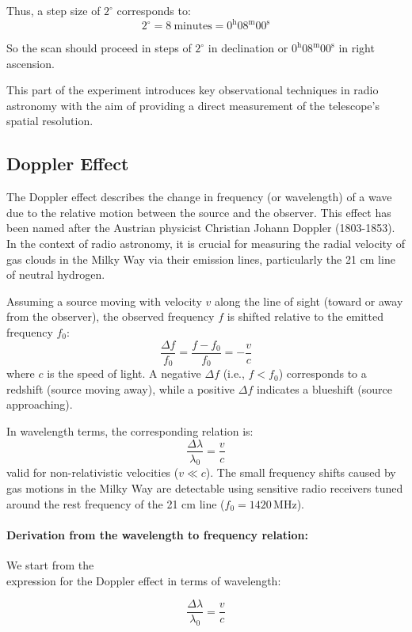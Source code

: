 \documentclass[12pt,a4paper]{article}
\begin{document}
Thus, a step size of \( 2^\circ \) corresponds to: 
\[
\boxed{
2^\circ = 8\ \text{minutes} = 0^\text{h}08^\text{m}00^\text{s}
}
\]

\noindent So the scan should proceed in steps of \( 2^\circ \) in declination or \( 0^\text{h}08^\text{m}00^\text{s} \) in right ascension.

This part of the experiment introduces key observational techniques in radio astronomy with the aim of providing a direct measurement of the telescope’s spatial resolution.

  \subsection{Doppler Effect}


  The Doppler effect describes the change in frequency (or wavelength) of a wave due to the relative motion between the source and the observer. This effect has been named after the Austrian physicist Christian Johann Doppler (1803-1853). In the context of radio astronomy, it is crucial for measuring the radial velocity of gas clouds in the Milky Way via their emission lines, particularly the 21 cm line of neutral hydrogen.
  
  Assuming a source moving with velocity $v$ along the line of sight (toward or away from the observer), the observed frequency $f$ is shifted relative to the emitted frequency $f_0$:
  \[
  \frac{\Delta f}{f_0} = \frac{f - f_0}{f_0} = -\frac{v}{c}
  \]
  where $c$ is the speed of light. A negative $\Delta f$ (i.e., $f < f_0$) corresponds to a redshift (source moving away), while a positive $\Delta f$ indicates a blueshift (source approaching).
  
  In wavelength terms, the corresponding relation is:
  \[
  \frac{\Delta \lambda}{\lambda_0} = \frac{v}{c}
  \]
  valid for non-relativistic velocities ($v \ll c$). The small frequency shifts caused by gas motions in the Milky Way are detectable using sensitive radio receivers tuned around the rest frequency of the 21 cm line ($f_0 = 1420\,\mathrm{MHz}$).
  

\paragraph{Derivation from the wavelength to frequency relation:}

We start from the \\ expression for the Doppler effect in terms of wavelength:

\begin{equation}
\frac{\Delta \lambda}{\lambda_0} = \frac{v}{c} \tag{2.1}
\end{equation}
\end{document}
